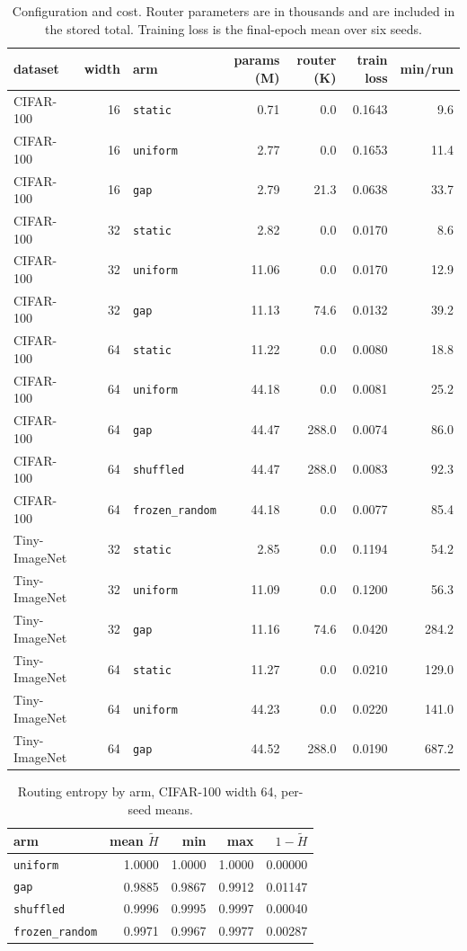 \documentclass[10pt,a4paper]{article}
\begin{document}
\begin{table}[h]\centering\small
\caption{Configuration and cost. Router parameters are in thousands and
are included in the stored total. Training loss is the final-epoch mean
over six seeds.}
\label{tab:config}
\begin{tabular}{l r l rr r r}
\toprule
dataset & width & arm & params (M) & router (K) & train loss & min/run \\
\midrule
CIFAR-100 & 16 & \texttt{static} & 0.71 & 0.0 & 0.1643 & 9.6 \\
CIFAR-100 & 16 & \texttt{uniform} & 2.77 & 0.0 & 0.1653 & 11.4 \\
CIFAR-100 & 16 & \texttt{gap} & 2.79 & 21.3 & 0.0638 & 33.7 \\
CIFAR-100 & 32 & \texttt{static} & 2.82 & 0.0 & 0.0170 & 8.6 \\
CIFAR-100 & 32 & \texttt{uniform} & 11.06 & 0.0 & 0.0170 & 12.9 \\
CIFAR-100 & 32 & \texttt{gap} & 11.13 & 74.6 & 0.0132 & 39.2 \\
CIFAR-100 & 64 & \texttt{static} & 11.22 & 0.0 & 0.0080 & 18.8 \\
CIFAR-100 & 64 & \texttt{uniform} & 44.18 & 0.0 & 0.0081 & 25.2 \\
CIFAR-100 & 64 & \texttt{gap} & 44.47 & 288.0 & 0.0074 & 86.0 \\
CIFAR-100 & 64 & \texttt{shuffled} & 44.47 & 288.0 & 0.0083 & 92.3 \\
CIFAR-100 & 64 & \texttt{frozen\_random} & 44.18 & 0.0 & 0.0077 & 85.4 \\
Tiny-ImageNet & 32 & \texttt{static} & 2.85 & 0.0 & 0.1194 & 54.2 \\
Tiny-ImageNet & 32 & \texttt{uniform} & 11.09 & 0.0 & 0.1200 & 56.3 \\
Tiny-ImageNet & 32 & \texttt{gap} & 11.16 & 74.6 & 0.0420 & 284.2 \\
Tiny-ImageNet & 64 & \texttt{static} & 11.27 & 0.0 & 0.0210 & 129.0 \\
Tiny-ImageNet & 64 & \texttt{uniform} & 44.23 & 0.0 & 0.0220 & 141.0 \\
Tiny-ImageNet & 64 & \texttt{gap} & 44.52 & 288.0 & 0.0190 & 687.2 \\
\bottomrule
\end{tabular}
\end{table}

\begin{table}[h]\centering\small
\caption{Routing entropy by arm, CIFAR-100 width 64, per-seed means.}
\label{tab:entw64}
\begin{tabular}{l rrr r}
\toprule
arm & mean $\tilde H$ & min & max & $1-\tilde H$ \\
\midrule
\texttt{uniform} & 1.0000 & 1.0000 & 1.0000 & 0.00000 \\
\texttt{gap} & 0.9885 & 0.9867 & 0.9912 & 0.01147 \\
\texttt{shuffled} & 0.9996 & 0.9995 & 0.9997 & 0.00040 \\
\texttt{frozen\_random} & 0.9971 & 0.9967 & 0.9977 & 0.00287 \\
\bottomrule
\end{tabular}
\end{table}
\end{document}
